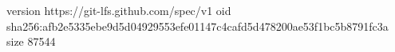 version https://git-lfs.github.com/spec/v1
oid sha256:afb2e5335ebe9d5d04929553efe01147c4cafd5d478200ae53f1bc5b8791fc3a
size 87544

